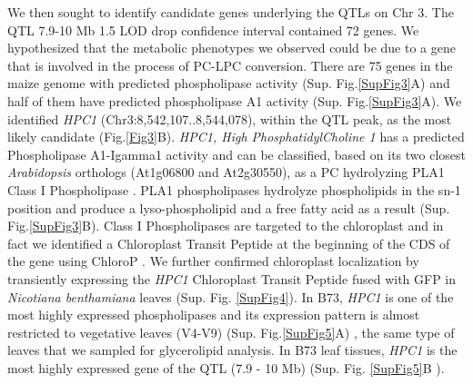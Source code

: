 \documentclass[9pt,twocolumn,twoside,lineno]{BioRxiv}
\begin{document}
We then sought to identify candidate genes underlying the QTLs on Chr 3.
The QTL 7.9-10 Mb 1.5 LOD drop confidence interval contained 72 genes. 
We hypothesized that the metabolic phenotypes we observed could be due to a gene that is involved in the process of PC-LPC conversion.  
There are 75 genes in the maize genome with predicted phospholipase activity (Sup. Fig.\ref{SupFig3}A) and half of them have predicted phospholipase A1 activity (Sup. Fig.\ref{SupFig3}A).  
We identified \textit{HPC1} (Chr3:8,542,107..8,544,078), within the QTL peak, as the most likely candidate (Fig.\ref{Fig3}B). 
\textit{HPC1, High PhosphatidylCholine 1} has a predicted Phospholipase A1-Igamma1 activity and can be classified, based on its two closest \textit{Arabidopsis} orthologs (At1g06800 and At2g30550), as a PC hydrolyzing PLA1 Class I Phospholipase \cite{Ryu2004-iv}. 
PLA1 phospholipases hydrolyze phospholipids in the sn-1 position and produce a lyso-phospholipid and a free fatty acid as a result (Sup. Fig.\ref{SupFig3}B). 
Class I Phospholipases are targeted to the chloroplast and in fact we identified a Chloroplast Transit Peptide at the beginning of the CDS of the gene using ChloroP \cite{Emanuelsson1999-rs}.
We further confirmed chloroplast localization by transiently expressing  the \textit{HPC1} Chloroplast Transit Peptide fused with GFP in \textit{Nicotiana benthamiana} leaves (Sup. Fig. \ref{SupFig4}).
In B73, \textit{HPC1} is one of the most highly expressed phospholipases and its expression pattern is almost restricted to vegetative leaves (V4-V9) (Sup. Fig.\ref{SupFig5}A) \cite{Stelpflug2016-vr}, the same type of leaves that we sampled for glycerolipid analysis. 
In B73 leaf tissues, \textit{HPC1} is the most highly expressed gene of the QTL (7.9 - 10 Mb) (Sup. Fig. \ref{SupFig5}B \cite{Stelpflug2016-vr}).
\end{document}
